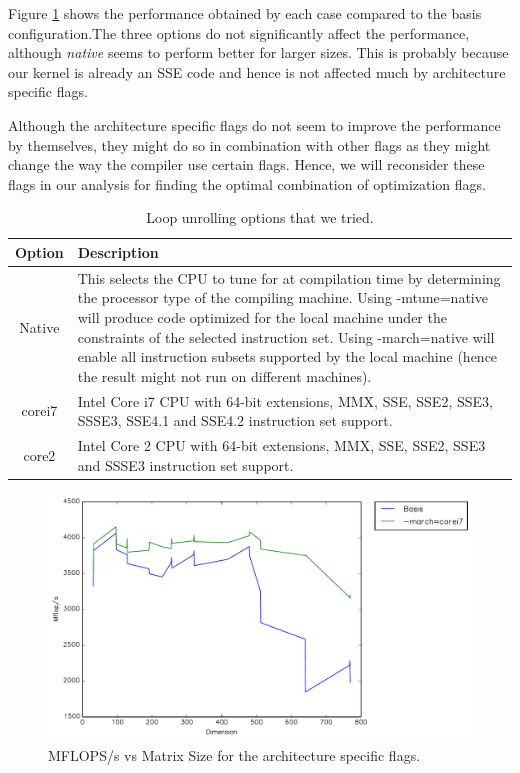 \documentclass{article}
\begin{document}
Figure \ref{fig:timing-march} shows the performance obtained by each case compared to the basis configuration.The three options do not significantly affect the performance, although \textit{native} seems to perform better for larger sizes. This is probably because our kernel is already an SSE code and hence is not affected much by architecture specific flags. 

Although the architecture specific flags do not seem to improve the performance by themselves, they might do so in combination with other flags as they might change the way the compiler use certain flags. Hence, we will reconsider these flags in our analysis for finding the optimal combination of optimization flags.

\begin{table}
\begin{center}
    \begin{tabular}{ | c | p{10cm} |}
    \hline
    Option & Description \\ \hline
    Native  & This selects the CPU to tune for at compilation time by determining the processor type of the compiling machine. Using -mtune=native will produce code optimized for the local machine under the constraints of the selected instruction set. Using -march=native will enable all instruction subsets supported by the local machine (hence the result might not run on different machines).  \\ \hline
    corei7 & Intel Core i7 CPU with 64-bit extensions, MMX, SSE, SSE2, SSE3, SSSE3, SSE4.1 and SSE4.2 instruction set support. \\ \hline
    core2 & Intel Core 2 CPU with 64-bit extensions, MMX, SSE, SSE2, SSE3 and SSSE3 instruction set support. \\ \hline
    \end{tabular}
    \caption{Loop unrolling options that we tried.}
    \label{tab:arch-march}
\end{center}
\end{table}


  \begin{figure}[h]
    \centering
    \includegraphics[width=.7\textwidth]{timing-march.pdf}
    \caption{MFLOPS/s vs Matrix Size for the architecture specific flags.}
    \label{fig:timing-march}
  \end{figure}
 
\end{document}
